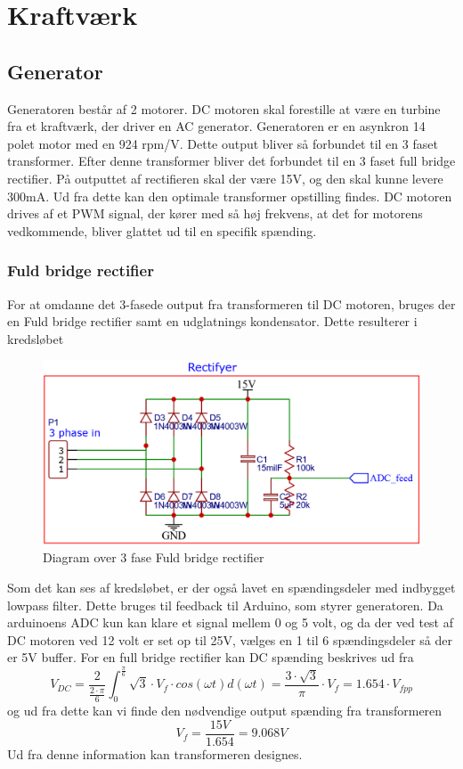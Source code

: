 \documentclass[../main.tex]{subfiles}
\begin{document}
\chapter{Kraftværk} \label{Chap:Kraftværk}

\section{Generator}
Generatoren består af 2 motorer. DC motoren skal forestille at være en turbine fra et kraftværk, der driver en AC generator. Generatoren er en asynkron 14 polet motor med en 924 rpm/V. Dette output bliver så forbundet til en 3 faset transformer. Efter denne transformer bliver det forbundet til en 3 faset full bridge rectifier. På outputtet af rectifieren skal der være 15V, og den skal kunne levere 300mA. Ud fra dette kan den optimale transformer opstilling findes. DC motoren drives af et PWM signal, der kører med så høj frekvens, at det for motorens vedkommende, bliver glattet ud til en specifik spænding.

\subsection{Fuld bridge rectifier}
For at omdanne det 3-fasede output fra transformeren til DC motoren, bruges der en Fuld bridge rectifier samt en udglatnings kondensator. Dette resulterer i kredsløbet 

\begin{figure}[H]
      \includegraphics[width=\textwidth]{Dokumentation/Figures/Rectifyer_dig.png}
     \caption{Diagram over 3 fase Fuld bridge rectifier}
     \label{fig: Rectifyer_dig}
     \end{figure}
Som det kan ses af kredsløbet, er der også lavet en spændingsdeler med indbygget lowpass filter. Dette bruges til feedback til Arduino, som styrer generatoren. Da arduinoens ADC kun kan klare et signal mellem 0 og 5 volt, og da der ved test af DC motoren ved 12 volt er set op til 25V, vælges en 1 til 6 spændingsdeler så der er 5V buffer.
For en full bridge rectifier kan DC spænding beskrives ud fra 
$$ V_{DC} = \frac{2}{\frac{2 \cdot \pi}{6}}\int_{0}^{\frac{\pi}{6}}\sqrt{3}\cdot V_f \cdot cos(\omega t) d(\omega t) = \frac{3 \cdot \sqrt{3}}{\pi} \cdot V_f = 1.654 \cdot V_{fpp} $$
og ud fra dette kan vi finde den nødvendige output spænding fra transformeren 
$$ V_{f}= \frac{15V}{1.654} = 9.068V$$
Ud fra denne information kan transformeren designes.
\end{document}
